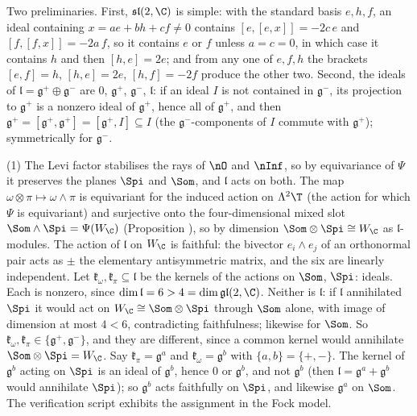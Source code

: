 Two preliminaries. First, $\mathfrak{sl}(2,\C)$ is simple: with the standard basis $e, h, f$, an ideal containing $x = ae + bh + cf \neq 0$ contains $[e,[e,x]] = -2c\,e$ and $[f,[f,x]] = -2a\,f$, so it contains $e$ or $f$ unless $a = c = 0$, in which case it contains $h$ and then $[h,e] = 2e$; and from any one of $e, f, h$ the brackets $[e,f] = h$, $[h,e] = 2e$, $[h,f] = -2f$ produce the other two. Second, the ideals of $\mathfrak{l} = \mathfrak{g}^+\oplus\mathfrak{g}^-$ are $0$, $\mathfrak{g}^+$, $\mathfrak{g}^-$, $\mathfrak{l}$: if an ideal $I$ is not contained in $\mathfrak{g}^-$, its projection to $\mathfrak{g}^+$ is a nonzero ideal of $\mathfrak{g}^+$, hence all of $\mathfrak{g}^+$, and then $\mathfrak{g}^+ = [\mathfrak{g}^+, \mathfrak{g}^+] = [\mathfrak{g}^+, I] \subseteq I$ (the $\mathfrak{g}^-$-components of $I$ commute with $\mathfrak{g}^+$); symmetrically for $\mathfrak{g}^-$.

(1) The Levi factor stabilises the rays of $\nO$ and $\nInf$, so by equivariance of $\Psi$ it preserves the planes $\Spi$ and $\Som$, and $\mathfrak{l}$ acts on both. The map $\omega\otimes\pi \mapsto \omega\wedge\pi$ is equivariant for the induced action on $\Lambda^2\T$ (the action for which $\Psi$ is equivariant) and surjective onto the four-dimensional mixed slot $\Som\wedge\Spi = \Psi(W_\C)$ (Proposition ), so by dimension $\Som\otimes\Spi \cong W_\C$ as $\mathfrak{l}$-modules. The action of $\mathfrak{l}$ on $W_\C$ is faithful: the bivector $e_i\wedge e_j$ of an orthonormal pair acts as $\pm$ the elementary antisymmetric matrix, and the six are linearly independent. Let $\mathfrak{k}_\omega, \mathfrak{k}_\pi \subseteq \mathfrak{l}$ be the kernels of the actions on $\Som$, $\Spi$: ideals. Each is nonzero, since $\dim\mathfrak{l} = 6 > 4 = \dim\mathfrak{gl}(2,\C)$. Neither is $\mathfrak{l}$: if $\mathfrak{l}$ annihilated $\Spi$ it would act on $W_\C \cong \Som\otimes\Spi$ through $\Som$ alone, with image of dimension at most $4 < 6$, contradicting faithfulness; likewise for $\Som$. So $\mathfrak{k}_\omega, \mathfrak{k}_\pi \in \{\mathfrak{g}^+, \mathfrak{g}^-\}$, and they are different, since a common kernel would annihilate $\Som\otimes\Spi = W_\C$. Say $\mathfrak{k}_\pi = \mathfrak{g}^a$ and $\mathfrak{k}_\omega = \mathfrak{g}^b$ with $\{a, b\} = \{+,-\}$. The kernel of $\mathfrak{g}^b$ acting on $\Spi$ is an ideal of $\mathfrak{g}^b$, hence $0$ or $\mathfrak{g}^b$, and not $\mathfrak{g}^b$ (then $\mathfrak{l} = \mathfrak{g}^a + \mathfrak{g}^b$ would annihilate $\Spi$); so $\mathfrak{g}^b$ acts faithfully on $\Spi$, and likewise $\mathfrak{g}^a$ on $\Som$. The verification script exhibits the assignment in the Fock model.

